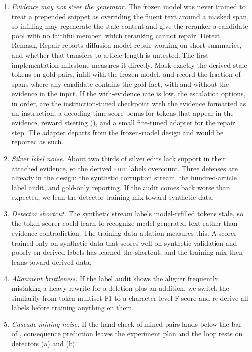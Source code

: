 \documentclass[]{paper}
\newcommand{\edit}{\textsc{edit}}
\begin{document}
\begin{enumerate}
\item \emph{Evidence may not steer the generator.} The frozen model was never trained to treat a prepended snippet as overriding the fluent text around a masked span, so infilling may regenerate the stale content and give the reranker a candidate pool with no faithful member, which reranking cannot repair. Detect, Remask, Repair reports diffusion-model repair working on short summaries, and whether that transfers to article length is untested. The first implementation milestone measures it directly. Mask exactly the derived stale tokens on gold pairs, infill with the frozen model, and record the fraction of spans where any candidate contains the gold fact, with and without the evidence in the input. If the with-evidence rate is low, the escalation options, in order, are the instruction-tuned checkpoint with the evidence formatted as an instruction, a decoding-time score bonus for tokens that appear in the evidence, reward steering (), and a small fine-tuned adapter for the repair step. The adapter departs from the frozen-model design and would be reported as such.
\item \emph{Silver label noise.} About two thirds of silver edits lack support in their attached evidence, so the derived \edit{} labels overcount. Three defenses are already in the design: the synthetic corruption stream, the hundred-article label audit, and gold-only reporting. If the audit comes back worse than expected, we lean the detector training mix toward synthetic data.
\item \emph{Detector shortcut.} The synthetic stream labels model-refilled tokens stale, so the token scorer could learn to recognize model-generated text rather than evidence contradiction. The training-data ablation measures this. A scorer trained only on synthetic data that scores well on synthetic validation and poorly on derived labels has learned the shortcut, and the training mix then leans toward derived data.
\item \emph{Alignment brittleness.} If the label audit shows the aligner frequently mistaking a heavy rewrite for a deletion plus an addition, we switch the similarity from token-multiset F1 to a character-level F-score and re-derive all labels before training anything on them.
\item \emph{Cascade mining noise.} If the hand-check of mined pairs lands below the bar of , consequence prediction leaves the experiment plan and the loop rests on detectors (a) and (b).

\end{enumerate}
\end{document}
